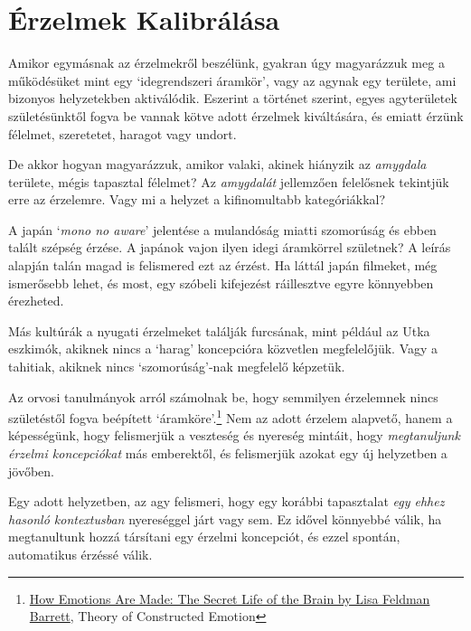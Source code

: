 \section{Érzelmek Kalibrálása}


\enlargethispage*{\baselineskip}

\noindent Amikor egymásnak az érzelmekről beszélünk, gyakran úgy
magyarázzuk meg a működésüket mint egy `idegrendszeri áramkör', vagy az
agynak egy területe, ami bizonyos helyzetekben aktiválódik. Eszerint a
történet szerint, egyes agyterületek születésünktől fogva be vannak
kötve adott érzelmek kiváltására, és emiatt érzünk félelmet, szeretetet,
haragot vagy undort.

De akkor hogyan magyarázzuk, amikor valaki, akinek hiányzik az
\emph{amygdala} területe, mégis tapasztal félelmet? Az \emph{amygdalát}
jellemzően felelősnek tekintjük erre az érzelemre. Vagy mi a helyzet a
kifinomultabb kategóriákkal?

A japán `\emph{mono no aware}' jelentése a mulandóság miatti szomorúság
és ebben talált szépség érzése. A japánok vajon ilyen idegi áramkörrel
születnek? A leírás alapján talán magad is felismered ezt az érzést. Ha
láttál japán filmeket, még ismerősebb lehet, és most, egy szóbeli
kifejezést ráillesztve egyre könnyebben érezheted.

Más kultúrák a nyugati érzelmeket találják furcsának, mint például az
Utka eszkimók, akiknek nincs a `harag' koncepcióra közvetlen
megfelelőjük. Vagy a tahitiak, akiknek nincs `szomorúság'-nak megfelelő
képzetük.

Az orvosi tanulmányok arról számolnak be, hogy semmilyen érzelemnek
nincs születéstől fogva beépített `áramköre'.\footnote{\href{https://www.goodreads.com/book/show/23719305-how-emotions-are-made}{How
  Emotions Are Made: The Secret Life of the Brain by Lisa Feldman
  Barrett}, Theory of Constructed Emotion} Nem az adott érzelem
alapvető, hanem a képességünk, hogy felismerjük a veszteség és nyereség
mintáit, hogy \emph{megtanuljunk érzelmi koncepciókat} más emberektől,
és felismerjük azokat egy új helyzetben a jövőben.

Egy adott helyzetben, az agy felismeri, hogy egy korábbi tapasztalat
\emph{egy ehhez hasonló kontextusban} nyereséggel járt vagy sem. Ez
idővel könnyebbé válik, ha megtanultunk hozzá társítani egy érzelmi
koncepciót, és ezzel spontán, automatikus érzéssé válik.

